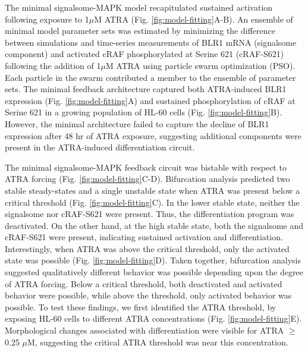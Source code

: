 \documentclass[10pt,twocolumn,twoside,final]{IEEEtran}
\begin{document}
The minimal signalsome-MAPK model recapitulated sustained activation following exposure to 1$\mu$M ATRA (Fig. \ref{fig:model-fitting}A-B).
An ensemble of minimal model parameter sets was estimated by minimizing the difference between simulations and time-series measurements of BLR1 mRNA (signalsome component) and activated cRAF phosphorylated at Serine 621 (cRAF-S621) following the addition of 1$\mu$M ATRA using particle swarm optimization (PSO). Each particle in the swarm contributed a member to the ensemble of parameter sets.
The minimal feedback architecture captured both ATRA-induced BLR1 expression (Fig. \ref{fig:model-fitting}A) and sustained phosphorylation of cRAF at Serine 621
in a growing population of HL-60 cells (Fig. \ref{fig:model-fitting}B).
However, the minimal architecture failed to capture the decline of BLR1 expression after 48 hr of ATRA exposure,
suggesting additional components were present in the ATRA-induced differentiation circuit.

The minimal signalsome-MAPK feedback circuit was bistable with respect to ATRA forcing (Fig. \ref{fig:model-fitting}C-D).
Bifurcation analysis predicted two stable steady-states and a single unstable state when ATRA was present below a critical threshold (Fig. \ref{fig:model-fitting}C).
In the lower stable state, neither the signalsome nor cRAF-S621 were present. Thus, the differentiation program was deactivated.
On the other hand, at the high stable state, both the signalsome and cRAF-S621 were present, indicating sustained activation and differentiation.
Interestingly, when ATRA was above the critical threshold, only the activated state was possible (Fig. \ref{fig:model-fitting}D).
Taken together, bifurcation analysis suggested qualitatively different behavior was possible depending upon the
degree of ATRA forcing. Below a critical threshold, both deactivated and activated behavior were possible, while above the threshold, only activated behavior was possible.
To test these findings, we first identified the ATRA threshold, by exposing HL-60 cells to different ATRA concentrations (Fig. \ref{fig:model-fitting}E).
Morphological changes associated with differentiation were visible for ATRA $\geq$ 0.25 $\mu$M, suggesting the critical ATRA
threshold was near this concentration.

\end{document}
